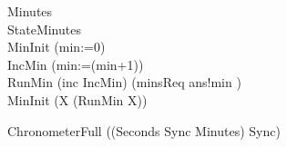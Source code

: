 \begin{circus}
\circprocess Minutes \circdef\ \circbegin\\
\circstate StateMinutes \\
MinInit \circdef (min:=0)\\
IncMin \circdef (min:=(min+1))\\
RunMin \circdef (inc \then IncMin) \extchoice (minsReq \then ans!min \then \Skip)\\
 \circspot MinInit \circseq (\circmu X \circspot (RunMin \circseq X))\\
\circend
\end{circus}
\begin{circus}
  \circprocess ChronometerFull \circdef ((Seconds \lpar Sync \rpar Minutes) \circhide Sync)
\end{circus}
%
%
%
%
